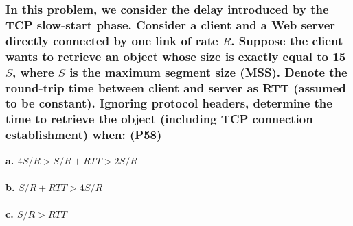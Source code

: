 \subsubsection{In this problem, we consider the delay introduced by the TCP slow-start phase. Consider a client and a Web server directly connected by one link of rate $R$. Suppose the client wants to retrieve an object whose size is exactly equal to 15 $S$, where $S$ is the maximum segment size (MSS). Denote the round-trip time between client and server as RTT (assumed to be constant). Ignoring protocol headers, determine the time to retrieve the object (including TCP connection establishment) when: (P58)}

\textbf{a. $4 S/R > S/R + RTT > 2 S/R$} \\
\\
\textbf{b. $S/R + RTT > 4 S/R$} \\
\\
\textbf{c. $S/R > RTT$} \\

